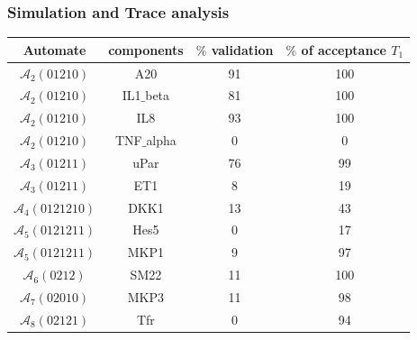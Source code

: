 \begin{frame}
\frametitle{Simulation and Trace analysis}
\begin{tabular}{|c|c||c|c|}
\hline

\textbf{Automate} & \textbf{components} & \textbf{$\%$  validation} & \textbf{$\%$ of acceptance $T_{1}$}
\\ \hline

$\mathcal{A}_{2}(01210)$ & A20 & 91 & 100 
\\ \hline

$\mathcal{A}_{2}(01210)$ & IL1$\_$beta & 81 & 100
\\ \hline

$\mathcal{A}_{2}(01210)$ & IL8 & 93 & 100 
\\ \hline

$\mathcal{A}_{2}(01210)$ & TNF$\_$alpha & 0 & 0
\\ \hline

$\mathcal{A}_{3}(01211)$ & uPar & 76 & 99 
\\ \hline

$\mathcal{A}_{3}(01211)$ & ET1 & 8 & 19 
\\ \hline

$\mathcal{A}_{4}(0121210)$ & DKK1 & 13 & 43

\\ \hline

$\mathcal{A}_{5}(0121211)$ & Hes5 & 0 & 17 
\\ \hline

$\mathcal{A}_{5}(0121211)$ & MKP1 & 9 & 97
\\ \hline

$\mathcal{A}_{6}(0212)$ & SM22 & 11 & 100 
\\ \hline

$\mathcal{A}_{7}(02010)$ & MKP3 & 11 & 98

\\ \hline

$\mathcal{A}_{8}(02121)$ & Tfr & 0 & 94 
\\ \hline

\end{tabular}

\end{frame}


